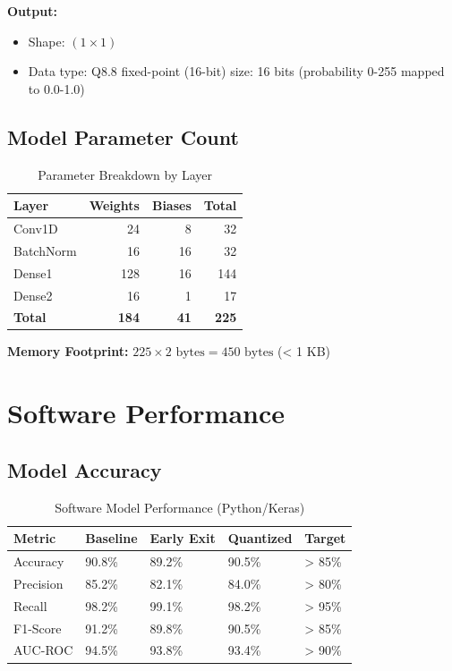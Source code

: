 \documentclass[11pt, a4paper]{article}
\begin{document}
\textbf{Output:}
\begin{itemize}
    \item Shape: $(1 \times 1)$
    \item Data type: Q8.8 fixed-point (16-bit)
    \bit size: 16 bits (probability 0-255 mapped to 0.0-1.0)
\end{itemize}

\subsection{Model Parameter Count}

\begin{table}[H]
\centering
\caption{Parameter Breakdown by Layer}
\label{tab:params}
\begin{tabular}{@{}lrrr@{}}
\toprule
\textbf{Layer} & \textbf{Weights} & \textbf{Biases} & \textbf{Total} \\ \midrule
Conv1D & 24 & 8 & 32 \\
BatchNorm & 16 & 16 & 32 \\
Dense1 & 128 & 16 & 144 \\
Dense2 & 16 & 1 & 17 \\ \midrule
\textbf{Total} & \textbf{184} & \textbf{41} & \textbf{225} \\ \bottomrule
\end{tabular}
\end{table}

\textbf{Memory Footprint:} $225 \times 2 \text{ bytes} = 450 \text{ bytes}$ (< 1 KB)

\section{Software Performance}

\subsection{Model Accuracy}

\begin{table}[H]
\centering
\caption{Software Model Performance (Python/Keras)}
\label{tab:sw_perf}
\begin{tabular}{@{}lllll@{}}
\toprule
\textbf{Metric} & \textbf{Baseline} & \textbf{Early Exit} & \textbf{Quantized} & \textbf{Target} \\ \midrule
Accuracy & 90.8\% & 89.2\% & 90.5\% & > 85\% \\
Precision & 85.2\% & 82.1\% & 84.0\% & > 80\% \\
Recall & 98.2\% & 99.1\% & 98.2\% & > 95\% \\
F1-Score & 91.2\% & 89.8\% & 90.5\% & > 85\% \\
AUC-ROC & 94.5\% & 93.8\% & 93.4\% & > 90\% \\ \bottomrule
\end{tabular}
\end{table}
\end{document}
